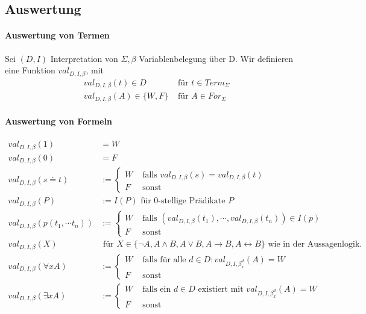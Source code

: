 \documentclass{article}
\begin{document}
\subsection{Auswertung}
\paragraph {Auswertung von Termen}
Sei $(D, I)$ Interpretation von $\Sigma, \beta$ Variablenbelegung \"uber D.
Wir definieren eine Funktion $val_{D,I,\beta}$, mit
\begin{align*}
    val_{D,I,\beta}(t) \in D & \text{ f\"ur } t \in Term_\Sigma \\
    val_{D,I,\beta}(A) \in \{W, F\} & \text{ f\"ur } A \in For_\Sigma
\end{align*}

\paragraph{Auswertung von Formeln}
\begin{align*}
val_{D,I,\beta} (1) &= W \\
val_{D,I,\beta} (0) &= F \\
val_{D,I,\beta}(s\doteq t) &:= \begin{cases}
    W &\text{ falls } val_{D,I,\beta}(s) = val_{D,I,\beta}(t) \\
    F &\text{ sonst}
\end{cases} \\
val_{D,I,\beta}(P) &:= I(P) \text{ f\"ur 0-stellige Pr\"adikate } P \\
val_{D,I,\beta}(p(t_1, \cdots t_n)) &:= \begin{cases}
    W &\text{ falls } (val_{D,I,\beta}(t_1), \cdots, val_{D,I,\beta}(t_n))
    \in I(p) \\
    F &\text{ sonst }
\end{cases} \\
val_{D,I,\beta} (X) & \text{ f\"ur } X \in \{\lnot A, A \land B, A \lor B, 
A \rightarrow B, A \leftrightarrow B \} \text{ wie in der 
Aussagenlogik.} \\
val_{D,I,\beta}(\forall x A) &:= \begin{cases}
    W & \text{ falls f\"ur alle } d \in D : val_{D,I,\beta_x^d}(A) = W \\
    F & \text { sonst}
\end{cases} \\
val_{D,I,\beta}(\exists x A) &:= \begin{cases}
    W & \text{ falls ein } d \in D \text{ existiert mit } val_{D,I,\beta_x^d}(A) = W \\
    F & \text { sonst}
\end{cases}
\end{align*}
\end{document}
